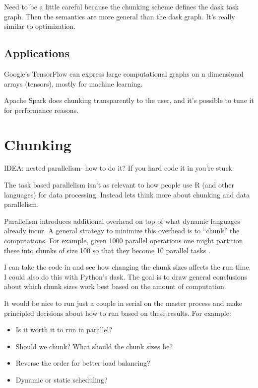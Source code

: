 \documentclass[12pt]{article}
\begin{document}
Need to be a little careful because the chunking scheme defines the dask
task graph. Then the semantics are more general than the dask graph. It's
really similar to optimization.

\subsection{Applications}

Google's TensorFlow can express large computational graphs on n dimensional
arrays (tensors), mostly for machine learning.

Apache Spark does chunking transparently to the user, and it's possible to
tune it for performance reasons.


\section{Chunking}

IDEA: nested parallelism- how to do it? If you hard code it in you're
stuck.

The task based parallelism isn't as relevant to how people use R (and other
languages) for data processing. Instead
lets think more about chunking and data parallelism. 

Parallelism introduces additional overhead on top of what dynamic languages
already incur. A general strategy to minimize this overhead is to ``chunk''
the computations. For example, given 1000 parallel operations one might
partition these into chunks of size 100 so that they become 10 parallel
tasks \cite{matloff2015parallel}.

I can take the code in \cite{matloff2015parallel} and see how changing the
chunk sizes affects the run time. I could also do this with Python's dask.
The goal is to draw general conclusions about which chunk sizes work best
based on the amount of computation.

It would be nice to run just a couple in serial on the master process and
make principled decisions about how to run based on these results. For
example:
\begin{itemize}
    \item Is it worth it to run in parallel?
    \item Should we chunk? What should the chunk sizes be?
    \item Reverse the order for better load balancing?
    \item Dynamic or static scheduling?
\end{itemize}
\end{document}
